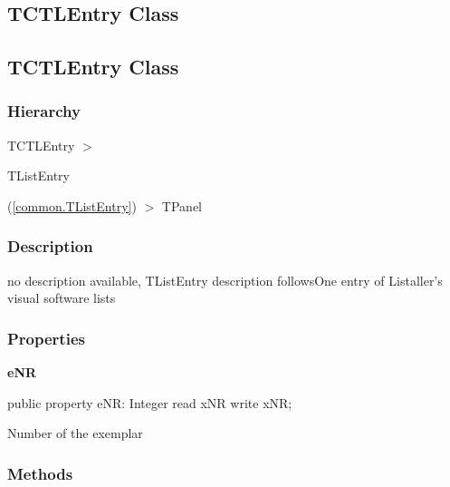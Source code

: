 \documentclass{report}
\newif\ifpdf
\begin{document}
\subsection*{\large{\textbf{TCTLEntry Class}}\normalsize\hspace{1ex}\hrulefill}
\else
\subsection*{TCTLEntry Class}
\fi
\label{swcatalog.TCTLEntry}
\subsubsection*{\large{\textbf{Hierarchy}}\normalsize\hspace{1ex}\hfill}
TCTLEntry {$>$} \begin{ttfamily}TListEntry\end{ttfamily}(\ref{common.TListEntry}) {$>$} 
TPanel
\subsubsection*{\large{\textbf{Description}}\normalsize\hspace{1ex}\hfill}
no description available, TListEntry description followsOne entry of Listaller's visual software lists\subsubsection*{\large{\textbf{Properties}}\normalsize\hspace{1ex}\hfill}
\begin{list}{}{
\setlength{\itemindent}{0cm}
\setlength{\listparindent}{0cm}
\setlength{\leftmargin}{\evensidemargin}
\addtolength{\leftmargin}{\tmplength}
\settowidth{\labelsep}{X}
\addtolength{\leftmargin}{\labelsep}
\setlength{\labelwidth}{\tmplength}
}
\label{swcatalog.TCTLEntry-eNR}
\item[\textbf{eNR}\hfill]
\ifpdf
\begin{flushleft}
\fi
\begin{ttfamily}
public property eNR: Integer read xNR write xNR;\end{ttfamily}

\ifpdf
\end{flushleft}
\fi


\par Number of the exemplar\end{list}
\subsubsection*{\large{\textbf{Methods}}\normalsize\hspace{1ex}\hfill}
\end{document}
